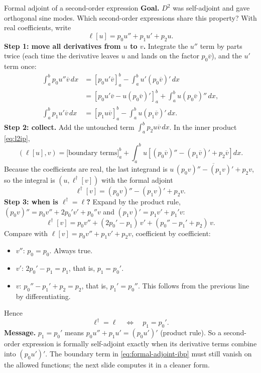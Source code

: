 \documentclass[11pt]{beamer}
\begin{document}
\begin{frame}[allowframebreaks=1.00]{Formal adjoint of a second-order expression}
\footnotesize
\textbf{Goal.} $D^2$ was self-adjoint and gave orthogonal sine modes. Which
second-order expressions share this property? With real coefficients, write
\begin{equation}
 \ell[u]=p_0u''+p_1u'+p_2u.\label{eq:Lgen}
\end{equation}
\textbf{Step 1: move all derivatives from \(u\) to \(v\).} Integrate the \(u''\) term by parts twice (each time the
derivative leaves \(u\) and lands on the factor \(p_0\overline v\)), and the \(u'\) term once:
\begin{align*}
 \int_a^b p_0u''\overline v\,dx
  &=\left[p_0u'\overline v\right]_a^b-\int_a^b u'(p_0\overline v)'\,dx\\
  &=\left[p_0u'\overline v-u(p_0\overline v)'\right]_a^b
    +\int_a^b u(p_0\overline v)''\,dx,\\
 \int_a^b p_1u'\overline v\,dx
  &=\left[p_1u\overline v\right]_a^b-\int_a^b u(p_1\overline v)'\,dx.
\end{align*}
\textbf{Step 2: collect.} Add the untouched term \(\int_a^b p_2u\overline v\,dx\). In the inner product \eqref{eq:l2ip},
\begin{equation}
 (\ell[u],v)
  =\bigl[\text{boundary terms}\bigr]_a^b
  +\int_a^b u\left[(p_0\overline v)''-(p_1\overline v)'+p_2\overline v\right]dx.
 \label{eq:formal-adjoint-ibp}
\end{equation}
Because the coefficients are real, the last integrand is
$u\,\overline{(p_0v)''-(p_1v)'+p_2v}$, so the integral is $(u,\ell^\dagger[v])$ with
the formal adjoint
\begin{equation}
 \ell^\dagger[v]=(p_0v)''-(p_1v)'+p_2v.\label{eq:Lstar}
\end{equation}
\textbf{Step 3: when is \(\ell^\dagger=\ell\)?} Expand by the product rule,
\((p_0v)''=p_0v''+2p_0'v'+p_0''v\) and \((p_1v)'=p_1v'+p_1'v\):
\[
 \ell^\dagger[v]=p_0v''+(2p_0'-p_1)\,v'+(p_0''-p_1'+p_2)\,v .
\]
Compare with \(\ell[v]=p_0v''+p_1v'+p_2v\), coefficient by coefficient:
\begin{itemize}
  \item \(v''\): \(p_0=p_0\). Always true.
  \item \(v'\): \(2p_0'-p_1=p_1\), that is, \(p_1=p_0'\).
  \item \(v\): \(p_0''-p_1'+p_2=p_2\), that is, \(p_1'=p_0''\). This follows from the previous line by
        differentiating.
\end{itemize}
Hence
\begin{equation}
 \ell^\dagger=\ell\quad\Longleftrightarrow\quad p_1=p_0'.\label{eq:pp1}
\end{equation}
\textbf{Message.} \(p_1=p_0'\) means \(p_0u''+p_1u'=(p_0u')'\) (product rule). So a second-order expression is
formally self-adjoint exactly when its derivative terms combine into \((p_0u')'\). The boundary term in
\eqref{eq:formal-adjoint-ibp} must still vanish on the allowed functions; the next slide computes it in a
cleaner form.
\end{frame}
\end{document}
